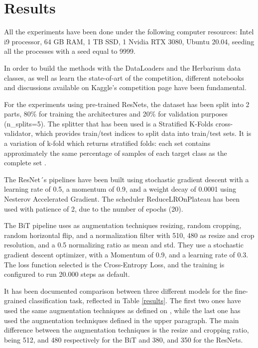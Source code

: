 \documentclass{article}
\begin{document}
\section{Results}

All the experiments have been done under the following computer resources: Intel i9 processor, 64 GB RAM, 1 TB SSD, 1 Nvidia RTX 3080, Ubuntu 20.04, seeding all the processes with a seed equal to 9999. 

In order to build the methods with the DataLoaders and the Herbarium data classes, as well as learn the state-of-art of the competition, different notebooks and discussions available on Kaggle's competition page  have been fundamental. \cite{k0,k1,k2,k3}

For the experiments using pre-trained ResNets, the dataset has been split into 2 parts, 80\% for training the architectures and 20\% for validation purposes (n\_splits=5). The splitter that has been used is a Stratified K-Folds cross-validator, which provides train/test indices to split data into train/test sets. It is a variation of k-fold which returns stratified folds: each set contains approximately the same percentage of samples of each target class as the complete set \cite{kfold}.

The ResNet´s pipelines have been built using stochastic gradient descent with a learning rate of 0.5, a momentum of 0.9, and a weight decay of 0.0001 using Nesterov Accelerated Gradient. The scheduler ReduceLROnPlateau has been used with patience of 2, due to the number of epochs (20).

The BiT pipeline uses as augmentation techniques resizing, random cropping, random horizontal flip, and a normalization filter with 510, 480 as resize and crop resolution, and a 0.5 normalizing ratio as mean and std. They use a stochastic gradient descent optimizer, with a Momentum of 0.9, and a learning rate of 0.3. The loss function selected is the Cross-Entropy Loss, and the training is configured to run 20.000 steps as default.

It has been documented comparison between three different models for the fine-grained classification task, reflected in Table \ref{results}. The first two ones have used the same augmentation techniques as defined on , while the last one has used the augmentation techniques defined in the upper paragraph. The main difference between the augmentation techniques is the resize and cropping ratio, being 512, and 480 respectively for the BiT and 380, and 350 for the ResNets.
\end{document}
